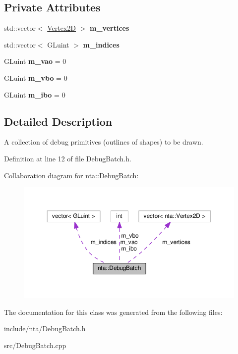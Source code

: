 \subsection*{Private Attributes}
\begin{DoxyCompactItemize}
\item 
\mbox{\label{classnta_1_1DebugBatch_a7c699660499350f5717a13dc2266cd9c}} 
std\+::vector$<$ \hyperlink{structnta_1_1Vertex2D}{Vertex2D} $>$ {\bfseries m\+\_\+vertices}
\item 
\mbox{\label{classnta_1_1DebugBatch_a1c0359676583c9c60d29b74b909939ee}} 
std\+::vector$<$ G\+Luint $>$ {\bfseries m\+\_\+indices}
\item 
\mbox{\label{classnta_1_1DebugBatch_a13089a13e5a589c9185c566e2957d0b5}} 
G\+Luint {\bfseries m\+\_\+vao} = 0
\item 
\mbox{\label{classnta_1_1DebugBatch_a8d3d799f71618a40d9403eda7f62a7de}} 
G\+Luint {\bfseries m\+\_\+vbo} = 0
\item 
\mbox{\label{classnta_1_1DebugBatch_ae85fcc91c2121dd5e438e73dfdf2c638}} 
G\+Luint {\bfseries m\+\_\+ibo} = 0
\end{DoxyCompactItemize}


\subsection{Detailed Description}
A collection of debug primitives (outlines of shapes) to be drawn. 

Definition at line 12 of file Debug\+Batch.\+h.



Collaboration diagram for nta\+:\+:Debug\+Batch\+:\nopagebreak
\begin{figure}[H]
\begin{center}
\leavevmode
\includegraphics[width=350pt]{db/d88/classnta_1_1DebugBatch__coll__graph}
\end{center}
\end{figure}


The documentation for this class was generated from the following files\+:\begin{DoxyCompactItemize}
\item 
include/nta/Debug\+Batch.\+h\item 
src/Debug\+Batch.\+cpp\end{DoxyCompactItemize}
